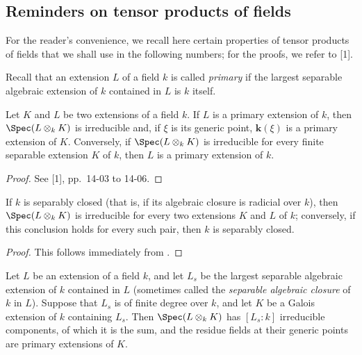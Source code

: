
\subsection{Reminders on tensor products of fields}
\label{subsection:IV.4.3}

For the reader's convenience, we recall here certain properties of
tensor products of fields that we shall use in the following numbers;
for the proofs, we refer to [1].

\begin{env}[4.3.1]
\label{IV.4.3.1}
Recall that an extension $L$ of a field $k$ is called
\emph{primary} if the largest separable algebraic extension of $k$
contained in $L$ is $k$ itself.
\end{env}

\begin{proposition}[4.3.2]
\label{IV.4.3.2}
Let $K$ and $L$ be two extensions of a field $k$.
If $L$ is a primary extension of $k$, then
$\Spec(L\otimes_k K)$ is irreducible and, if $\xi$ is its generic
point, $\boldsymbol{k}(\xi)$ is a primary extension of $K$.
Conversely, if $\Spec(L\otimes_k K)$ is irreducible for every finite
separable extension $K$ of $k$, then $L$ is a primary extension of $k$.
\end{proposition}

\begin{proof}
See [1], pp.~14-03 to 14-06.
\end{proof}

\begin{corollary}[4.3.3]
\label{IV.4.3.3}
If $k$ is separably closed \textup{(that is,} if its algebraic closure is
radicial over $k$\textup{)}, then $\Spec(L\otimes_k K)$ is irreducible for every
two extensions $K$ and $L$ of $k$; conversely, if this conclusion holds
for every such pair, then $k$ is separably closed.
\end{corollary}

\begin{proof}
This follows immediately from .
\end{proof}

\begin{corollary}[4.3.4]
\label{IV.4.3.4}
Let $L$ be an extension of a field $k$, and let $L_s$ be the largest
separable algebraic extension of $k$ contained in $L$ \textup{(sometimes called
the \emph{separable algebraic closure} of $k$ in $L$)}.
Suppose that $L_s$ is of finite degree over $k$, and let $K$ be a
Galois extension of $k$ containing $L_s$.
Then $\Spec(L\otimes_k K)$ has $[L_s:k]$ irreducible components, of which
it is the sum, and the residue fields at their generic points are primary
extensions of $K$.
\end{corollary}

